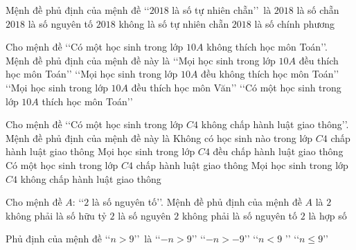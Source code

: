 \begin{ex}%
	Mệnh đề phủ định của mệnh đề  \lq\lq $2018$ là số tự nhiên chẵn\rq\rq\ là
	 \choice
		{$2018$  là số chẵn}
		{$2018$ là số nguyên  tố}
		{\True$2018$ không  là số tự nhiên chẵn}
		{$2018$ là số chính phương} 
\end{ex}

\begin{ex}%
	Cho mệnh đề \lq\lq Có một học sinh trong lớp $10A$ không thích học môn Toán\rq\rq. Mệnh đề phủ định của  mệnh đề này là
	\choice 
		{\True\lq\lq Mọi học sinh trong lớp $10A$ đều thích  học môn Toán\rq\rq}
		{\lq\lq Mọi học sinh trong lớp $10A$ đều không thích học môn  Toán\rq\rq}
		 {\lq\lq Mọi học sinh trong lớp $10A$ đều thích học môn Văn\rq\rq}
		{\lq\lq  Có một học sinh trong lớp $10A$ thích học môn Toán\rq\rq}
\end{ex}

\begin{ex}%
	Cho  mệnh đề \lq\lq Có một học sinh trong lớp $C4$ không chấp hành luật giao thông\rq\rq. Mệnh đề phủ định của mệnh đề này là
	\choice 
		{Không có học sinh nào  trong lớp $C4$ chấp hành luật giao thông}
		{\True Mọi học  sinh trong lớp $C4$ đều chấp hành luật giao thông}
		{Có một  học sinh trong lớp $C4$ chấp hành luật giao thông}
		{Mọi học sinh trong lớp $C4$ không  chấp hành luật giao thông}
\end{ex}

\begin{ex}%
	Cho mệnh đề $A$: \lq\lq $2$ là số nguyên  tố\rq\rq. Mệnh đề phủ định của mệnh đề $A$ là
	\choice 
		{$2$ không phải là  số hữu tỷ}
		 {$2$ là số nguyên}
		{\True$2$ không phải là số nguyên  tố}
		{$2$  là hợp số}
\end{ex}

\begin{ex}%
	Phủ  định của mệnh đề \lq\lq $n > 9$\rq\rq\ là
	\choice 
		{\lq\lq  $-n > 9$\rq\rq}
		{\lq\lq $-n >-9$\rq\rq} 
		{\lq\lq $n < 9$  \rq\rq}
		{\True\lq\lq $n \leq 9$\rq\rq} 
\end{ex}

